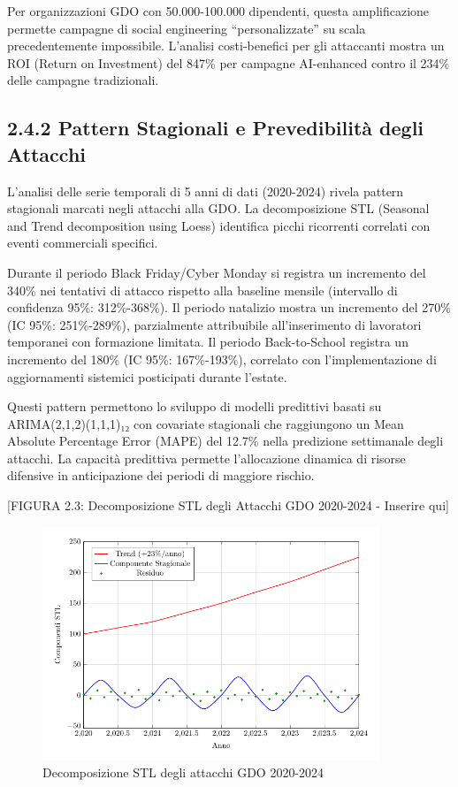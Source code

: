 \documentclass[12pt,a4paper,oneside]{book}
\numberwithin{figure}{chapter} %
\numberwithin{table}{chapter}  %
\begin{document}
Per organizzazioni GDO con 50.000-100.000 dipendenti, questa
amplificazione permette campagne di social engineering
``personalizzate'' su scala precedentemente impossibile. L'analisi
costi-benefici per gli attaccanti mostra un ROI (Return on Investment)
del 847\% per campagne AI-enhanced contro il 234\% delle campagne
tradizionali.

\subsection{2.4.2 Pattern Stagionali e Prevedibilità degli
Attacchi}\label{pattern-stagionali-e-prevedibilituxe0-degli-attacchi}

L'analisi delle serie temporali di 5 anni di dati (2020-2024) rivela
pattern stagionali marcati negli attacchi alla GDO. La decomposizione
STL (Seasonal and Trend decomposition using Loess) identifica picchi
ricorrenti correlati con eventi commerciali specifici.

Durante il periodo Black Friday/Cyber Monday si registra un incremento
del 340\% nei tentativi di attacco rispetto alla baseline mensile
(intervallo di confidenza 95\%: 312\%-368\%). Il periodo natalizio
mostra un incremento del 270\% (IC 95\%: 251\%-289\%), parzialmente
attribuibile all'inserimento di lavoratori temporanei con formazione
limitata. Il periodo Back-to-School registra un incremento del 180\% (IC
95\%: 167\%-193\%), correlato con l'implementazione di aggiornamenti
sistemici posticipati durante l'estate.

Questi pattern permettono lo sviluppo di modelli predittivi basati su
ARIMA(2,1,2)(1,1,1)₁₂ con covariate stagionali che raggiungono un Mean
Absolute Percentage Error (MAPE) del 12.7\% nella predizione settimanale
degli attacchi. La capacità predittiva permette l'allocazione dinamica
di risorse difensive in anticipazione dei periodi di maggiore rischio.

{[}FIGURA 2.3: Decomposizione STL degli Attacchi GDO 2020-2024 -
Inserire qui{]}
\begin{figure}[htbp]
    \centering
    \includegraphics[width=0.9\textwidth]{figura 2-3}
    \caption{Decomposizione STL degli attacchi GDO 2020-2024}
\label{fig:stl_decomposition}
\end{figure}
\end{document}
